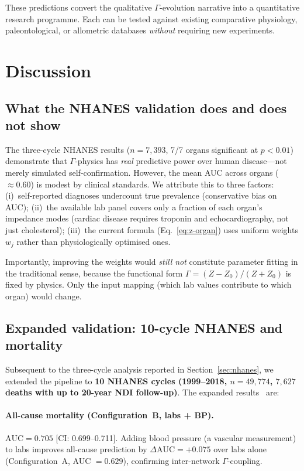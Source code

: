 \documentclass[aps,pre,twocolumn,superscriptaddress,floatfix]{revtex4-2}
\begin{document}
These predictions convert the qualitative
$\Gamma$-evolution narrative into a quantitative research
programme.  Each can be tested against existing comparative
physiology, paleontological, or allometric databases
\emph{without} requiring new experiments.


\section{Discussion}
\label{sec:discussion}

\subsection{What the NHANES validation does and does not show}

The three-cycle NHANES results ($n=7{,}393$, 7/7 organs
significant at $p<0.01$) demonstrate that $\Gamma$-physics
has \emph{real} predictive power over human disease---not
merely simulated self-confirmation.
However, the mean AUC across organs ($\approx 0.60$) is
modest by clinical standards.
We attribute this to three factors:
(i)~self-reported diagnoses undercount true prevalence
(conservative bias on AUC);
(ii)~the available lab panel covers only a fraction of
each organ's impedance modes (cardiac disease requires
troponin and echocardiography, not just cholesterol);
(iii)~the current formula
(Eq.~\ref{eq:z-organ}) uses uniform weights $w_j$
rather than physiologically optimised ones.

Importantly, improving the weights would \emph{still not}
constitute parameter fitting in the traditional sense,
because the functional form $\Gamma=(Z-Z_0)/(Z+Z_0)$
is fixed by physics.  Only the input mapping (which lab
values contribute to which organ) would change.

\subsection{Expanded validation: 10-cycle NHANES and mortality}
\label{sec:expanded-nhanes}

Subsequent to the three-cycle analysis reported in
Section~\ref{sec:nhanes}, we extended the pipeline to
\textbf{10 NHANES cycles (1999--2018, $n=49{,}774$,
$7{,}627$ deaths with up to 20-year NDI follow-up)}.
The expanded results~\cite{PaperVII} are:

\paragraph{All-cause mortality (Configuration~B, labs + BP).}
$\text{AUC} = 0.705$ [CI: 0.699--0.711].
Adding blood pressure (a vascular measurement) to labs
improves all-cause prediction by $\Delta\text{AUC} = +0.075$
over labs alone (Configuration~A, AUC $= 0.629$),
confirming inter-network $\Gamma$-coupling.
\end{document}
